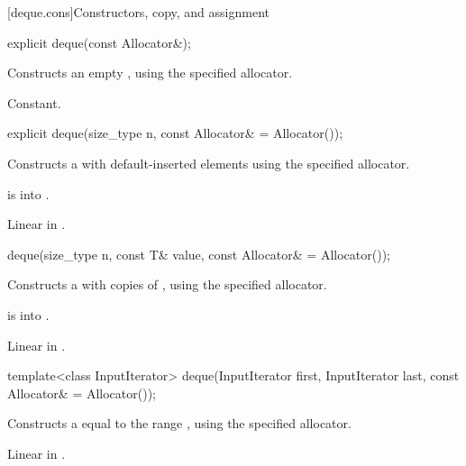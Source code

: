 [deque.cons]{Constructors, copy, and assignment}

%
\begin{itemdecl}
explicit deque(const Allocator&);
\end{itemdecl}

\begin{itemdescr}
\pnum
\effects
Constructs an empty
,
using the specified allocator.

\pnum
\complexity
Constant.
\end{itemdescr}

%
\begin{itemdecl}
explicit deque(size_type n, const Allocator& = Allocator());
\end{itemdecl}

\begin{itemdescr}
\pnum
\effects
Constructs a  with
 default-inserted elements using the specified allocator.

\pnum
\expects
{} is  into .

\pnum
\complexity
Linear in .
\end{itemdescr}

%
\begin{itemdecl}
deque(size_type n, const T& value, const Allocator& = Allocator());
\end{itemdecl}

\begin{itemdescr}
\pnum
\effects
Constructs a
with  copies of ,
using the specified allocator.

\pnum
\expects
{} is  into .

\pnum
\complexity
Linear in .
\end{itemdescr}

%
\begin{itemdecl}
template<class InputIterator>
  deque(InputIterator first, InputIterator last, const Allocator& = Allocator());
\end{itemdecl}

\begin{itemdescr}
\pnum
\effects
Constructs a
equal to the range
,
using the specified allocator.

\pnum
\complexity
Linear in .
\end{itemdescr}

